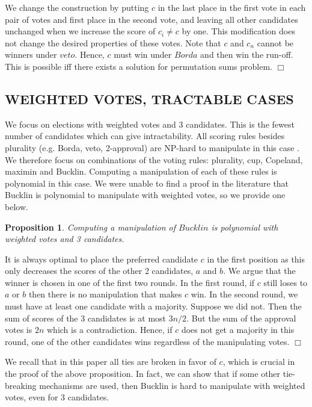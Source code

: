 \documentclass{ecai2012}
\newtheorem{proposition}{Proposition}
\newcommand{\myproof}{\vspace{-3mm}\noindent {\bf Proof:\ \ }}
\newcommand{\myqed}{\mbox{$\Box$}}
\newcommand\lirong[1]{}
\begin{document}
\vspace{-1mm}We change the construction by putting $c$ in the last place
in the first vote in each pair of votes and first place in the second
vote, and leaving all other candidates unchanged when we increase
the score of $c_i \neq c$ by one.
This modification does not change the desired properties of these votes.
Note that $c$ and $c_n$ cannot be winners
under $veto$. Hence, $c$ must win under $Borda$ and then
win the run-off.
This is possible iff there exists a solution for permutation sums problem.
\myqed


\subsection*{WEIGHTED VOTES, TRACTABLE CASES}

We focus on elections with weighted votes
and 3 candidates.
This is the fewest number
of candidates which can give intractability.
All scoring rules besides
plurality (e.g. Borda, veto, 2-approval)
are NP-hard to manipulate in this case
\cite{dichotomy}.
We therefore focus on combinations of the voting rules:
plurality, cup, Copeland, maximin and Bucklin.
Computing a manipulation of each of these
rules is polynomial in this case.
We were unable to find a proof in the literature
that Bucklin is polynomial to manipulate with weighted votes,
so we provide one below.

\begin{proposition}
Computing a manipulation of $Bucklin$
is polynomial with weighted votes and 3 candidates.
\end{proposition}
\myproof
It is always optimal to place the
preferred candidate $c$ in the first
position as this only decreases the scores of
the other 2 candidates, $a$ and $b$.
We argue that the winner is
chosen in one of the first two rounds.
In the first round, if $c$ still loses to
$a$ or $b$ then there is no manipulation
that makes $c$ win.
In the second round, we must have at least
one candidate with a majority. Suppose we did not.
Then the sum of scores of the 3 candidates is at most
$3n/2$. But the sum of the approval votes is $2n$
which is a contradiction. Hence, if $c$ does not
get a majority in this round, one of the other
candidates wins regardless of the manipulating
votes.
\myqed

We recall that in this paper all ties are broken in favor of $c$, which is crucial in the proof of the above proposition. In fact, we can show that if some other tie-breaking mechanisms are used, then Bucklin is hard to manipulate with weighted votes, even for $3$ candidates. \lirong{I added this clarification.}
\end{document}
